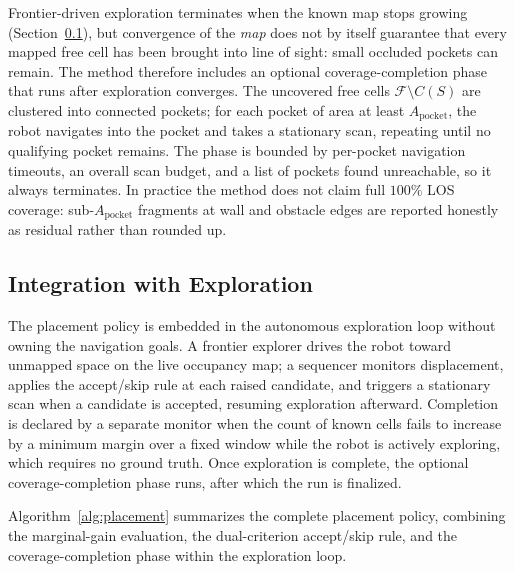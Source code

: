 \documentclass[sensors,article,submit,pdftex,moreauthors]{Definitions/mdpi}
\begin{document}
Frontier-driven exploration terminates when the known map stops growing
(Section~\ref{sec:integration}), but convergence of the \emph{map} does not by
itself guarantee that every mapped free cell has been brought into line of
sight: small occluded pockets can remain. The method therefore includes an
optional coverage-completion phase that runs after exploration converges. The
uncovered free cells $\mathcal{F}\setminus C(S)$ are clustered into connected
pockets; for each pocket of area at least $A_{\mathrm{pocket}}$, the robot
navigates into the pocket and takes a stationary scan, repeating until no
qualifying pocket remains. The phase is bounded by per-pocket navigation
timeouts, an overall scan budget, and a list of pockets found unreachable, so it
always terminates. In practice the method does not claim full $100\%$ LOS
coverage: sub-$A_{\mathrm{pocket}}$ fragments at wall and obstacle edges are
reported honestly as residual rather than rounded up.

\subsection{Integration with Exploration}
\label{sec:integration}

The placement policy is embedded in the autonomous exploration loop without
owning the navigation goals. A frontier explorer drives the robot toward
unmapped space on the live occupancy map; a sequencer monitors displacement,
applies the accept/skip rule at each raised candidate, and triggers a stationary
scan when a candidate is accepted, resuming exploration afterward. Completion is
declared by a separate monitor when the count of known cells fails to increase by
a minimum margin over a fixed window while the robot is actively exploring, which
requires no ground truth. Once exploration is complete, the optional
coverage-completion phase runs, after which the run is finalized.

Algorithm~\ref{alg:placement} summarizes the complete placement policy, combining
the marginal-gain evaluation, the dual-criterion accept/skip rule, and the
coverage-completion phase within the exploration loop.
\end{document}
